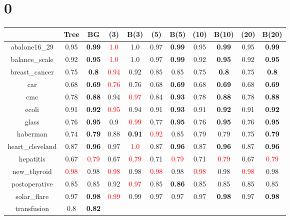 \documentclass{article}%
\begin{document}
%
\normalsize%
\section*{0}%
\begin{tabular}{c|cccccccccc}%
\hline%
&Tree&BG&(3)&B(3)&(5)&B(5)&(10)&B(10)&(20)&B(20)\\%
\hline%
abalone16\_29&0.95&\textbf{0.99}&\textcolor{red}{ 
1.0
}&1.0&0.97&\textbf{0.99}&0.95&\textbf{0.99}&0.95&\textbf{0.99}\\%
\hline%
balance\_scale&0.92&\textbf{0.95}&\textcolor{red}{ 
1.0
}&1.0&0.97&\textbf{0.99}&0.92&\textbf{0.95}&0.92&\textbf{0.95}\\%
\hline%
breast\_cancer&0.75&\textbf{0.8}&\textcolor{red}{ 
0.94
}&0.92&0.85&0.85&0.75&\textbf{0.8}&0.75&\textbf{0.8}\\%
\hline%
car&0.68&\textbf{0.69}&\textcolor{red}{ 
0.76
}&0.76&0.68&\textbf{0.69}&0.68&\textbf{0.69}&0.68&\textbf{0.69}\\%
\hline%
cmc&0.78&\textbf{0.88}&0.94&\textcolor{red}{ 
0.97
}&0.84&\textbf{0.93}&0.78&\textbf{0.88}&0.78&\textbf{0.88}\\%
\hline%
ecoli&0.91&\textbf{0.92}&\textcolor{red}{ 
0.95
}&0.94&0.91&\textbf{0.93}&0.91&\textbf{0.92}&0.91&\textbf{0.92}\\%
\hline%
glass&0.76&\textbf{0.95}&0.9&\textcolor{red}{ 
0.99
}&0.77&\textbf{0.95}&0.76&\textbf{0.95}&0.76&\textbf{0.95}\\%
\hline%
haberman&0.74&\textbf{0.79}&0.88&\textbf{0.91}&\textcolor{red}{ 
0.92
}&0.85&0.79&0.79&0.75&\textbf{0.79}\\%
\hline%
heart\_cleveland&0.87&\textbf{0.96}&0.97&\textcolor{red}{ 
1.0
}&0.87&\textbf{0.96}&0.87&\textbf{0.96}&0.87&\textbf{0.96}\\%
\hline%
hepatitis&0.67&\textcolor{red}{ 
0.79
}&0.67&\textcolor{red}{ 
0.79
}&0.71&\textcolor{red}{ 
0.79
}&0.71&\textcolor{red}{ 
0.79
}&0.67&\textcolor{red}{ 
0.79
}\\%
\hline%
new\_thyroid&\textcolor{red}{ 
0.98
}&0.98&\textcolor{red}{ 
0.98
}&0.98&\textcolor{red}{ 
0.98
}&0.98&\textcolor{red}{ 
0.98
}&0.98&\textcolor{red}{ 
0.98
}&0.98\\%
\hline%
postoperative&0.85&0.85&0.92&\textcolor{red}{ 
0.97
}&0.85&\textbf{0.86}&0.85&0.85&0.85&0.85\\%
\hline%
solar\_flare&0.97&\textbf{0.98}&\textcolor{red}{ 
0.99
}&0.99&0.97&0.97&0.97&\textbf{0.98}&0.97&\textbf{0.98}\\%
\hline%
transfusion&0.8&\textbf{0.82}&\textcolor{red}{ 
}
\end{tabular}
\end{document}
